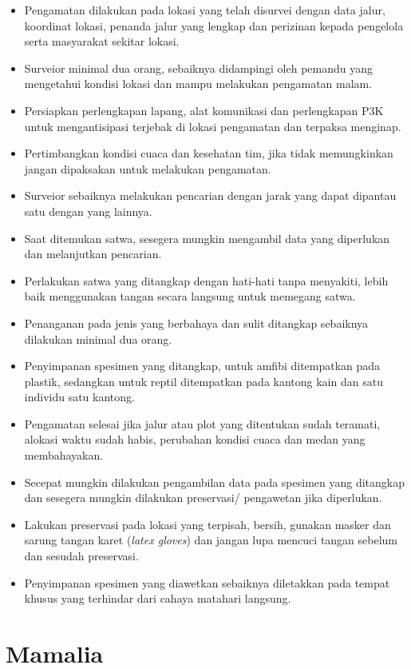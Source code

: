 \documentclass[
]{book}
\providecommand{\tightlist}{%
  \setlength{\itemsep}{0pt}\setlength{\parskip}{0pt}}
\begin{document}
\begin{itemize}
\tightlist
\item
  Pengamatan dilakukan pada lokasi yang telah disurvei dengan data jalur, koordinat lokasi, penanda jalur yang lengkap dan perizinan kepada pengelola serta masyarakat sekitar lokasi.
\item
  Surveior minimal dua orang, sebaiknya didampingi oleh pemandu yang mengetahui kondisi lokasi dan mampu melakukan pengamatan malam.
\item
  Persiapkan perlengkapan lapang, alat komunikasi dan perlengkapan P3K untuk mengantisipasi terjebak di lokasi pengamatan dan terpaksa menginap.
\item
  Pertimbangkan kondisi cuaca dan kesehatan tim, jika tidak memungkinkan jangan dipaksakan untuk melakukan pengamatan.
\item
  Surveior sebaiknya melakukan pencarian dengan jarak yang dapat dipantau satu dengan yang lainnya.
\item
  Saat ditemukan satwa, sesegera mungkin mengambil data yang diperlukan dan melanjutkan pencarian.
\item
  Perlakukan satwa yang ditangkap dengan hati-hati tanpa menyakiti, lebih baik menggunakan tangan secara langsung untuk memegang satwa.
\item
  Penanganan pada jenis yang berbahaya dan sulit ditangkap sebaiknya dilakukan minimal dua orang.
\item
  Penyimpanan spesimen yang ditangkap, untuk amfibi ditempatkan pada plastik, sedangkan untuk reptil ditempatkan pada kantong kain dan satu individu satu kantong.
\item
  Pengamatan selesai jika jalur atau plot yang ditentukan sudah teramati, alokasi waktu sudah habis, perubahan kondisi cuaca dan medan yang membahayakan.
\item
  Secepat mungkin dilakukan pengambilan data pada spesimen yang ditangkap dan sesegera mungkin dilakukan preservasi/ pengawetan jika diperlukan.
\item
  Lakukan preservasi pada lokasi yang terpisah, bersih, gunakan masker dan sarung tangan karet (\emph{latex gloves}) dan jangan lupa mencuci tangan sebelum dan sesudah preservasi.
\item
  Penyimpanan spesimen yang diawetkan sebaiknya diletakkan pada tempat khusus yang terhindar dari cahaya matahari langsung.
\end{itemize}

\hypertarget{mamalia}{%
\section*{Mamalia}\label{mamalia}}
\end{document}
